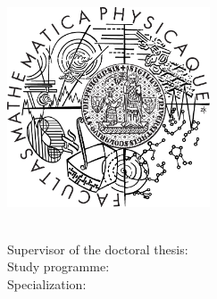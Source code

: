 \begin{titlepage}
\begin{addmargin}[-10mm]{-30mm}  %
\large
\hfill

\vfill{}


\begin{center}
\myUni\\
\myFaculty\\
\bigskip{}
\begingroup \color{Maroon}  \endgroup
\par\end{center}

\begin{center}
\bigskip{}

\par\end{center}

\begin{center}
\includegraphics[width=6cm]{gfx/logo}\\
 \vfill{}

\par\end{center}

\begin{center}
\spacedlowsmallcaps{\myName}\medskip{}

\par\end{center}

\begin{center}
\begingroup \color{Maroon} \spacedallcaps{\myTitle} \endgroup
\par\end{center}

\medskip{}


\begin{center}
\myDepartment\\
Supervisor of the doctoral thesis: \mySupervisor\\
Study programme: \myStudyProgramme\\
Specialization: \mySpecialization\\

\par\end{center}

\vfill{}


\end{addmargin} 
\end{titlepage} 
